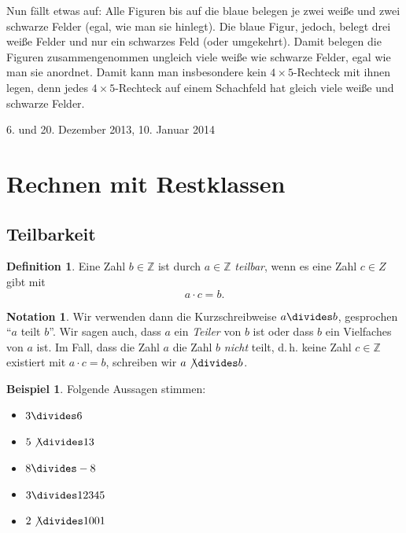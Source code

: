 \documentclass[a4paper,ngerman,12pt]{scrartcl}
\newcommand{\Z}{\mathbb{Z}}
\newcommand{\datum}[1]{\hfill {#1}\\}
\theoremstyle{definition}
\newtheorem{defn}{Definition}
\newtheorem*{nota}{Notation}
\newtheorem*{bsp}{Beispiel}
\begin{document}
\begin{antw}
\begin{center}
{
    }
  \end{center}
  Nun fällt etwas auf: Alle Figuren bis auf die blaue belegen je zwei weiße und zwei schwarze Felder (egal, wie man sie hinlegt). Die blaue Figur, jedoch, belegt drei weiße Felder und nur ein schwarzes Feld (oder umgekehrt). Damit belegen die Figuren zusammengenommen ungleich viele weiße wie schwarze Felder, egal wie man sie anordnet. Damit kann man insbesondere kein $4 \times 5$-Rechteck mit ihnen legen, denn jedes $4 \times 5$-Rechteck auf einem Schachfeld hat gleich viele weiße und schwarze Felder.
\end{antw}

\datum{6. und 20. Dezember 2013, 10. Januar 2014}

\section{Rechnen mit Restklassen}

\subsection{Teilbarkeit}

\begin{defn}
  Eine Zahl $b \in \Z$ ist durch $a \in \Z$ \emph{teilbar}, wenn es eine Zahl $c \in Z$ gibt mit
  \[ a \cdot c = b. \]
\end{defn}

\begin{nota}
  Wir verwenden dann die Kurzschreibweise $a \divides b$, gesprochen "`$a$ teilt $b$"'. Wir sagen auch, dass $a$ ein \emph{Teiler} von $b$ ist oder dass $b$ ein Vielfaches von $a$ ist. Im Fall, dass die Zahl $a$ die Zahl $b$ \emph{nicht} teilt, d.\,h. keine Zahl $c \in \Z$ existiert mit $a \cdot c = b$, schreiben wir $a \not\divides b$.
\end{nota}

\begin{bsp}
  Folgende Aussagen stimmen:
  \begin{multicols}{5}
    \begin{itemize}
      \item $3 \divides 6$
      \item $5 \not\divides 13$
      \item $8 \divides -8$
      \item $3 \divides 12345$
      \item $2 \not\divides 1001$
    \end{itemize}
  \end{multicols}
\end{bsp}
\end{document}
